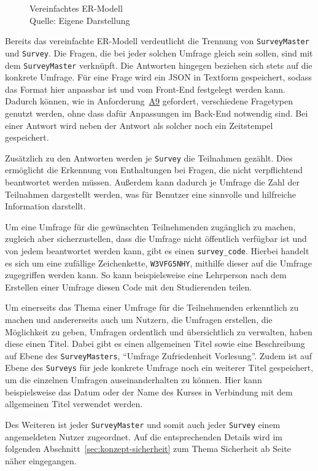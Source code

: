 \begin{figure}[ht]
	\centering
	\def\svgscale{0.72}
	\graphicspath{{img/backend/database/}}
	\scriptsize{}
	\captionsetup{format=plain, justification=centering}
	\caption[Vereinfachtes \acs{ER-Modell}]{Vereinfachtes \acs{ER-Modell}\\Quelle: Eigene Darstellung}
	\label{fig:er-model-simplified}
\end{figure}

Bereits das vereinfachte \acs{ER-Modell} verdeutlicht die Trennung von \texttt{SurveyMaster} und \texttt{Survey}.
Die Fragen, die bei jeder solchen Umfrage gleich sein sollen, sind mit dem \texttt{SurveyMaster} verknüpft.
Die Antworten hingegen beziehen sich stets auf die konkrete Umfrage.
Für eine Frage wird ein \acs{JSON} in Textform gespeichert, sodass das Format hier anpassbar ist und vom Front-End festgelegt werden kann.
Dadurch können, wie in Anforderung~\hyperref[Anf:A9]{A9} gefordert, verschiedene Fragetypen genutzt werden, ohne dass dafür Anpassungen im Back-End notwendig sind.
Bei einer Antwort wird neben der Antwort als solcher noch ein Zeitstempel gespeichert.

Zusätzlich zu den Antworten werden je \texttt{Survey} die Teilnahmen gezählt.
Dies ermöglicht die Erkennung von Enthaltungen bei Fragen, die nicht verpflichtend beantwortet werden müssen.
Außerdem kann dadurch je Umfrage die Zahl der Teilnahmen dargestellt werden, was für Benutzer eine sinnvolle und hilfreiche Information darstellt.

Um eine Umfrage für die gewünschten Teilnehmenden zugänglich zu machen, zugleich aber sicherzustellen, dass die Umfrage nicht öffentlich verfügbar ist und von jedem beantwortet werden kann, gibt es einen \texttt{survey\_code}.
Hierbei handelt es sich um eine zufällige Zeichenkette, \zb \texttt{W3VFG5NHY}, mithilfe dieser auf die Umfrage zugegriffen werden kann.
So kann beispielsweise eine Lehrperson nach dem Erstellen einer Umfrage diesen Code mit den Studierenden teilen.

Um einerseits das Thema einer Umfrage für die Teilnehmenden erkenntlich zu machen und andererseits auch um Nutzern, die Umfragen erstellen, die Möglichkeit zu geben, Umfragen ordentlich und übersichtlich zu verwalten, haben diese einen Titel.
Dabei gibt es einen allgemeinen Titel sowie eine Beschreibung auf Ebene des \texttt{SurveyMasters}, \zb \enquote{Umfrage Zufriedenheit Vorlesung}.
Zudem ist auf Ebene des \texttt{Surveys} für jede konkrete Umfrage noch ein weiterer Titel gespeichert, um die einzelnen Umfragen auseinanderhalten zu können.
Hier kann beispielsweise das Datum oder der Name des Kurses in Verbindung mit dem allgemeinen Titel verwendet werden.

Des Weiteren ist jeder \texttt{SurveyMaster} und somit auch jeder \texttt{Survey} einem angemeldeten Nutzer zugeordnet.
Auf die entsprechenden Details wird im folgenden Abschnitt~\ref{sec:konzept-sicherheit} zum Thema Sicherheit ab Seite~\pageref{sec:authentifizierung} näher eingegangen.
